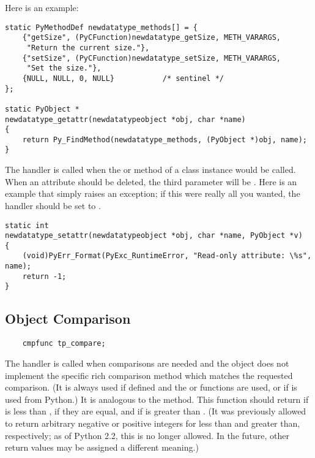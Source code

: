 Here is an example:

\begin{verbatim}
static PyMethodDef newdatatype_methods[] = {
    {"getSize", (PyCFunction)newdatatype_getSize, METH_VARARGS,
     "Return the current size."},
    {"setSize", (PyCFunction)newdatatype_setSize, METH_VARARGS,
     "Set the size."},
    {NULL, NULL, 0, NULL}           /* sentinel */
};

static PyObject *
newdatatype_getattr(newdatatypeobject *obj, char *name)
{
    return Py_FindMethod(newdatatype_methods, (PyObject *)obj, name);
}
\end{verbatim}

The  handler is called when the
 or  method of a class
instance would be called.  When an attribute should be deleted, the
third parameter will be \NULL.  Here is an example that simply raises
an exception; if this were really all you wanted, the
 handler should be set to \NULL.
   
\begin{verbatim}
static int
newdatatype_setattr(newdatatypeobject *obj, char *name, PyObject *v)
{
    (void)PyErr_Format(PyExc_RuntimeError, "Read-only attribute: \%s", name);
    return -1;
}
\end{verbatim}


\subsection{Object Comparison}

\begin{verbatim}
    cmpfunc tp_compare;
\end{verbatim}

The  handler is called when comparisons are needed
and the object does not implement the specific rich comparison method
which matches the requested comparison.  (It is always used if defined
and the  or 
functions are used, or if  is used from Python.)
It is analogous to the  method.  This function
should return  if  is less than
,  if they are equal, and  if
 is greater than
.
(It was previously allowed to return arbitrary negative or positive
integers for less than and greater than, respectively; as of Python
2.2, this is no longer allowed.  In the future, other return values
may be assigned a different meaning.)

